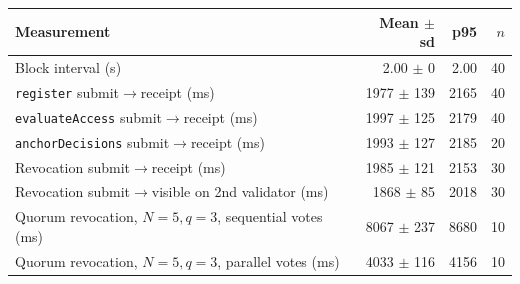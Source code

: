 \begin{tabular}{@{}lrrr@{}}
\toprule
Measurement & Mean $\pm$ sd & p95 & $n$ \\
\midrule
Block interval (s) & 2.00 $\pm$ 0 & 2.00 & 40 \\
\texttt{register} submit$\to$receipt (ms) & 1977 $\pm$ 139 & 2165 & 40 \\
\texttt{evaluateAccess} submit$\to$receipt (ms) & 1997 $\pm$ 125 & 2179 & 40 \\
\texttt{anchorDecisions} submit$\to$receipt (ms) & 1993 $\pm$ 127 & 2185 & 20 \\
Revocation submit$\to$receipt (ms) & 1985 $\pm$ 121 & 2153 & 30 \\
Revocation submit$\to$visible on 2nd validator (ms) & 1868 $\pm$ 85 & 2018 & 30 \\
Quorum revocation, $N{=}5,q{=}3$, sequential votes (ms) & 8067 $\pm$ 237 & 8680 & 10 \\
Quorum revocation, $N{=}5,q{=}3$, parallel votes (ms) & 4033 $\pm$ 116 & 4156 & 10 \\
\bottomrule
\end{tabular}
